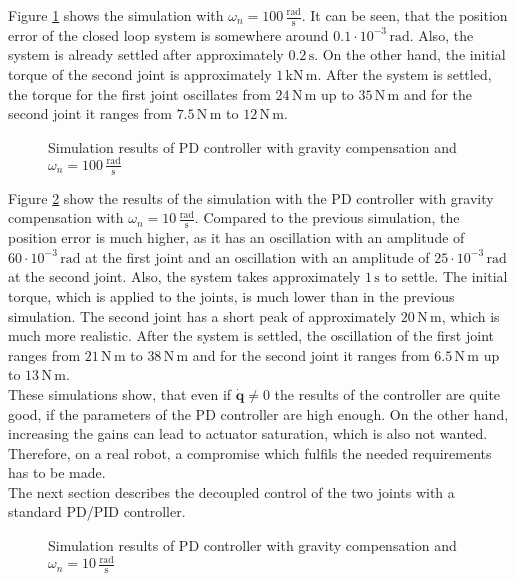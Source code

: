 Figure \ref{fig:ch3_sim11} shows the simulation with $\omega_n = 100\,\mathrm{\frac{rad}{s}}$. It can be seen, that the position error of the closed loop system is somewhere around $0.1\cdot10^{-3}\,\mathrm{rad}$. Also, the system is already settled after approximately $0.2\,\mathrm{s}$. On the other hand, the initial torque of the second joint is approximately $1\,\mathrm{kN\,m}$. After the system is settled, the torque for the first joint oscillates from $24\,\mathrm{N\,m}$ up to $35\,\mathrm{N\,m}$ and for the second joint it ranges from $7.5\,\mathrm{N\,m}$ to $12\,\mathrm{N\,m}$.
\begin{figure}[H]
	\centering
	
	\caption{Simulation results of PD controller with gravity compensation and $\omega_n = 100\,\mathrm{\frac{rad}{s}}$}
	\label{fig:ch3_sim11}
\end{figure}
Figure \ref{fig:ch3_sim12} show the results of the simulation with the PD controller with gravity compensation with $\omega_n =  10\,\mathrm{\frac{rad}{s}}$. Compared to the previous simulation, the position error is much higher, as it has an oscillation with an amplitude of $60\cdot10^{-3}\,\mathrm{rad}$ at the first joint and an oscillation with an amplitude of $25\cdot10^{-3}\,\mathrm{rad}$ at the second joint. Also, the system takes approximately $1\,\mathrm{s}$ to settle. The initial torque, which is applied to the joints, is much lower than in the previous simulation. The second joint has a short peak of approximately $20\,\mathrm{N\,m}$, which is much more realistic. After the system is settled, the oscillation of the first joint ranges from $21\,\mathrm{N\,m}$ to $38\,\mathrm{N\,m}$ and for the second joint it ranges from $6.5\,\mathrm{N\,m}$ up to $13\,\mathrm{N\,m}$.\\
These simulations show, that even if $\mathbf{\dot{q}} \neq 0$ the results of the controller are quite good, if the parameters of the PD controller are high enough. On the other hand, increasing the gains can lead to actuator saturation, which is also not wanted. Therefore, on a real robot, a compromise which fulfils the needed requirements has to be made.\\
The next section describes the decoupled control of the two joints with a standard PD/PID controller.
\begin{figure}[H]
	\centering
	
	\caption{Simulation results of PD controller with gravity compensation and $\omega_n = 10\,\mathrm{\frac{rad}{s}}$}
	\label{fig:ch3_sim12}
\end{figure}
